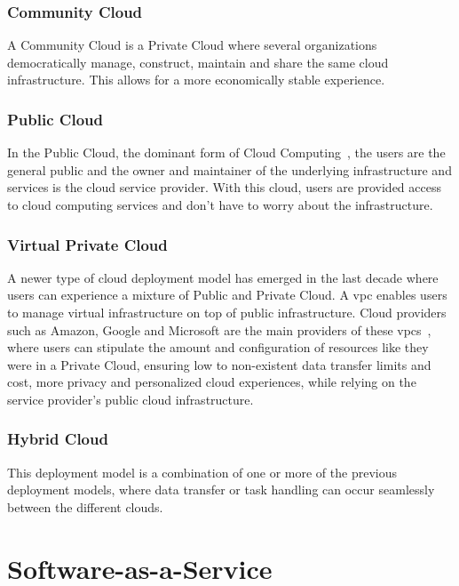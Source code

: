 \subsubsection{Community Cloud}\label{state-of-the-art:sss:community-cloud}
A Community Cloud is a Private Cloud where several organizations democratically manage, construct, maintain and share the same cloud infrastructure. This allows for a more economically stable experience.

\subsubsection{Public Cloud}\label{state-of-the-art:sss:public-cloud}
In the Public Cloud, the dominant form of Cloud Computing~\Parencite{dillon_tharam_and_wu_chen_and_chang_elizabeth}, the users are the general public and the owner and maintainer of the underlying infrastructure and services is the cloud service provider. With this cloud, users are provided access to cloud computing services and don't have to worry about the infrastructure.

\subsubsection{Virtual Private Cloud}\label{state-of-the-art:sss:virtual-private-cloud}
A newer type of cloud deployment model has emerged in the last decade where users can experience a mixture of Public and Private Cloud. A \gls{vpc} enables users to manage virtual infrastructure on top of public infrastructure. Cloud providers such as Amazon, Google and Microsoft are the main providers of these \glspl{vpc}~\Parencite{aljamal_el-mousa_jubair_2018}, where users can stipulate the amount and configuration of resources like they were in a Private Cloud, ensuring low to non-existent data transfer limits and cost, more privacy and personalized cloud experiences, while relying on the service provider's public cloud infrastructure.

\subsubsection{Hybrid Cloud}\label{state-of-the-art:sss:hybrid-cloud} 
This deployment model is a combination of one or more of the previous deployment models, where data transfer or task handling can occur seamlessly between the different clouds.

\section{Software-as-a-Service}\label{state-of-the-art:s:software-as-a-service}

